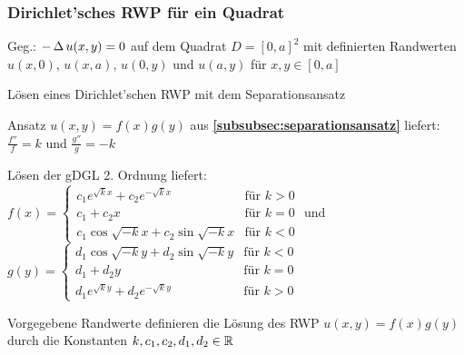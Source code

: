 \documentclass[german,color,5pt]{latex4ei/latex4ei_fs}
\begin{document}
\begin{sectionbox}
	\subsubsection{Dirichlet'sches RWP für ein Quadrat}
	Geg.: $-\operatorname{\Delta} u(x,y)=0$ auf dem Quadrat $D=[0,a]^2$ mit definierten Randwerten $u(x,0)$, $u(x,a)$, $u(0,y)$ und $u(a,y)$ für $x,y\in [0,a]$
	\begin{cookbox}{Lösen eines Dirichlet'schen RWP mit dem Separationsansatz}
		\item Ansatz $u(x,y)=f(x)g(y)$ aus {\bf\ref{subsubsec:separationsansatz}} liefert: $\frac{f''}{f}=k$ und $\frac{g''}{g}=-k$
		\item Lösen der gDGL 2. Ordnung liefert:\\
		$f(x)=\begin{cases}
		c_1e^{\sqrt{k}x}+c_2e^{-\sqrt{k}x} & \text{für } k>0\\
		c_1+c_2x & \text{für }  k=0\\
		c_1\cos\sqrt{-k}x+c_2\sin\sqrt{-k}x & \text{für } k<0
		\end{cases}$ \qquad und \\
		$g(y)=\begin{cases}
		d_1\cos\sqrt{-k}y+d_2\sin\sqrt{-k}y & \text{für } k<0\\
		d_1+d_2y & \text{für }  k=0\\
		d_1e^{\sqrt{k}y}+d_2e^{-\sqrt{k}y} & \text{für } k>0
		\end{cases}$
		\item Vorgegebene Randwerte definieren die Lösung des RWP $u(x,y)=f(x)g(y)$ durch die Konstanten $k,c_1,c_2,d_1,d_2\in\operatorname{\mathbb R}$
	\end{cookbox}
\end{sectionbox}

\end{document}
